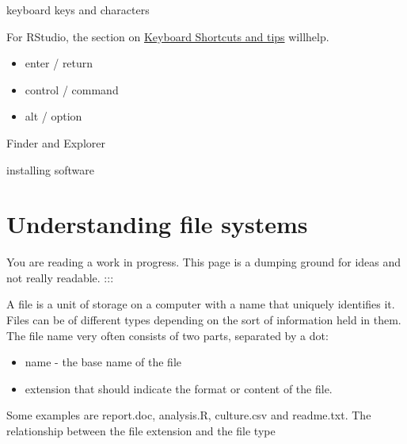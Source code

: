 \documentclass[
  letterpaper,
  DIV=11,
  numbers=noendperiod]{scrreprt}
\providecommand{\tightlist}{%
  \setlength{\itemsep}{0pt}\setlength{\parskip}{0pt}}\usepackage{longtable,booktabs,array}
\begin{document}
keyboard keys and characters

For RStudio, the section on
\protect\hyperlink{keyboard-short-cuts-and-other-tips}{Keyboard
Shortcuts and tips} willhelp.

\begin{itemize}
\tightlist
\item
  enter / return
\item
  control / command
\item
  alt / option
\end{itemize}

Finder and Explorer

installing software

\hypertarget{understanding-file-systems}{%
\chapter{Understanding file systems}\label{understanding-file-systems}}

\begin{tcolorbox}[enhanced jigsaw, opacitybacktitle=0.6, toprule=.15mm, arc=.35mm, colback=white, colframe=quarto-callout-important-color-frame, opacityback=0, titlerule=0mm, colbacktitle=quarto-callout-important-color!10!white, leftrule=.75mm, breakable, bottomtitle=1mm, toptitle=1mm, title=\textcolor{quarto-callout-important-color}{\faExclamation}\hspace{0.5em}{Important}, rightrule=.15mm, bottomrule=.15mm, coltitle=black, left=2mm]

You are reading a work in progress. This page is a dumping ground for
ideas and not really readable. :::

\end{tcolorbox}

A file is a unit of storage on a computer with a name that uniquely
identifies it. Files can be of different types depending on the sort of
information held in them. The file name very often consists of two
parts, separated by a dot:

\begin{itemize}
\item
  name - the base name of the file
\item
  extension that should indicate the format or content of the file.
\end{itemize}

Some examples are report.doc, analysis.R, culture.csv and readme.txt.
The relationship between the file extension and the file type
\end{document}
